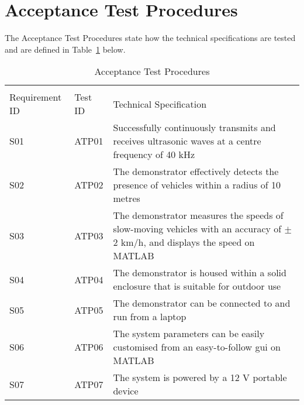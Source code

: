 \documentclass[class=report,11pt,crop=false]{standalone}
\begin{document}
\section{Acceptance Test Procedures}
The Acceptance Test Procedures state how the technical specifications are tested and are defined in Table~\ref{tab:Table 3} below.
\begin{table}[!htp]
\centering
\caption{\label{tab:Table 3} Acceptance Test Procedures}
\vspace{-0.5cm}
\begin{tabular}{|m{7em}|m{7em}|m{10cm}|}
\multicolumn{3}{l}{}\\
\cline{1-3}
Requirement ID  & Test ID & Technical Specification\\ \cline{1-3}
S01   & ATP01 & Successfully continuously transmits and receives ultrasonic waves at a centre frequency of 40 kHz\\ \cline{1-3}
S02   & ATP02 & The demonstrator effectively detects the presence of vehicles within a radius of 10 metres \\ \cline{1-3}
S03   & ATP03 & The demonstrator measures the speeds of slow-moving vehicles with an accuracy of $\pm$2 km/h, and displays the speed on \textsc{MATLAB} \\ \cline{1-3}
S04   & ATP04 & The demonstrator is housed within a solid enclosure that is suitable for outdoor use \\ \cline{1-3}
S05   & ATP05 & The demonstrator can be connected to and run from a laptop \\ \cline{1-3}
S06   & ATP06 & The system parameters can be easily customised from an easy-to-follow \gls{gui} on \textsc{MATLAB}\\ \cline{1-3}
S07   & ATP07 & The system is powered by a 12 V portable device \\ \cline{1-3}
\end{tabular}
\end{table}
\ifstandalone

\printnoidxglossary[type=\acronymtype,nonumberlist]
\fi
\end{document}
